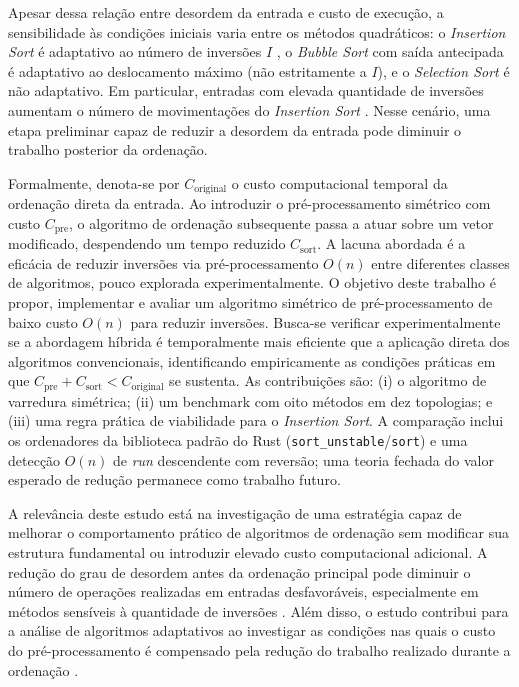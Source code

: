 \documentclass[portuguese]{sbc2025}%
\begin{document}
Apesar dessa relação entre desordem da entrada e custo de execução, a sensibilidade às condições iniciais varia entre os métodos quadráticos: o \emph{Insertion Sort} é adaptativo ao número de inversões $I$ \citep{mannila_measures_1984, estivill-castro_survey_1992}, o \emph{Bubble Sort} com saída antecipada é adaptativo ao deslocamento máximo (não estritamente a $I$), e o \emph{Selection Sort} é não adaptativo. Em particular, entradas com elevada quantidade de inversões aumentam o número de movimentações do \emph{Insertion Sort} \citep{cormen_introduction_2022}. Nesse cenário, uma etapa preliminar capaz de reduzir a desordem da entrada pode diminuir o trabalho posterior da ordenação.

Formalmente, denota-se por $C_{\text{original}}$ o custo computacional temporal da ordenação direta da entrada. Ao introduzir o pré-processamento simétrico com custo $C_{\text{pre}}$, o algoritmo de ordenação subsequente passa a atuar sobre um vetor modificado, despendendo um tempo reduzido $C_{\text{sort}}$. A lacuna abordada é a eficácia de reduzir inversões via pré-processamento $O(n)$ entre diferentes classes de algoritmos, pouco explorada experimentalmente. O objetivo deste trabalho é propor, implementar e avaliar um algoritmo simétrico de pré-processamento de baixo custo $O(n)$ para reduzir inversões. Busca-se verificar experimentalmente se a abordagem híbrida é temporalmente mais eficiente que a aplicação direta dos algoritmos convencionais, identificando empiricamente as condições práticas em que $C_{\text{pre}} + C_{\text{sort}} < C_{\text{original}}$ se sustenta. As contribuições são: (i) o algoritmo de varredura simétrica; (ii) um benchmark com oito métodos em dez topologias; e (iii) uma regra prática de viabilidade para o \emph{Insertion Sort}. A comparação inclui os ordenadores da biblioteca padrão do Rust (\texttt{sort\_unstable}/\texttt{sort}) e uma detecção $O(n)$ de \emph{run} descendente com reversão; uma teoria fechada do valor esperado de redução permanece como trabalho futuro.

A relevância deste estudo está na investigação de uma estratégia capaz de melhorar o comportamento prático de algoritmos de ordenação sem modificar sua estrutura fundamental ou introduzir elevado custo computacional adicional. A redução do grau de desordem antes da ordenação principal pode diminuir o número de operações realizadas em entradas desfavoráveis, especialmente em métodos sensíveis à quantidade de inversões \citep{estivill-castro_survey_1992, hwang_presorting_2000}. Além disso, o estudo contribui para a análise de algoritmos adaptativos ao investigar as condições nas quais o custo do pré-processamento é compensado pela redução do trabalho realizado durante a ordenação \citep{mannila_measures_1984, hwang_presorting_2000}.
\end{document}
